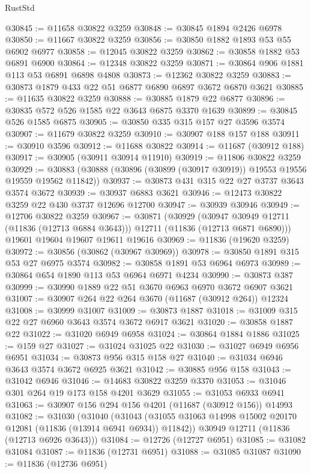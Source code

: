 \begin{lexlean}{RustStd}
\begin{coremodule}
@30845 := @11658 @30822 @3259
@30848 := @30845 @1894 @2426 @6978
@30850 := @11667 @30822 @3259
@30856 := @30850 @1882 @1893 @53 @55 @6902 @6977
@30858 := @12045 @30822 @3259
@30862 := @30858 @1882 @53 @6891 @6900
@30864 := @12348 @30822 @3259
@30871 := @30864 @906 @1881 @113 @53 @6891 @6898 @4808
@30873 := @12362 @30822 @3259
@30883 := @30873 @1879 @433 @22 @51 @6877 @6890 @6897 @3672 @6870 @3621
@30885 := @11635 @30822 @3259
@30888 := @30885 @1879 @22 @6877
@30896 := @30835 @572 @526 @1585 @22 @3643 @6875 @3370 @1639
@30899 := @30845 @526 @1585 @6875
@30905 := @30850 @335 @315 @157 @27 @3596 @3574
@30907 := @11679 @30822 @3259
@30910 := @30907 @188 @157 @188
@30911 := @30910 @3596
@30912 := @11688 @30822
@30914 := @11687 (@30912 @188)
@30917 := @30905 (@30911 @30914 @11910)
@30919 := @11806 @30822 @3259
@30929 := @30883 (@30888 (@30896 (@30899 (@30917 @30919)) @19553 @19556 @19559 @19562 @11842))
@30937 := @30873 @431 @315 @22 @27 @3737 @3643 @3574 @3672
@30939 := @30937 @6883 @3621
@30946 := @12473 @30822 @3259 @22 @430 @3737 @12696 @12700
@30947 := @30939 @30946
@30949 := @12706 @30822 @3259
@30967 := @30871
    (@30929
      (@30947 @30949 @12711 (@11836 (@12713 @6884 @3643)))
      @12711
      (@11836 (@12713 @6871 @6890)))
    @19601
    @19604
    @19607
    @19611
    @19616
@30969 := @11836 (@19620 @3259)
@30972 := @30856 (@30862 (@30967 @30969))
@30978 := @30850 @1891 @315 @53 @27 @6975 @3574
@30982 := @30858 @1891 @53 @6964 @6973
@30989 := @30864 @654 @1890 @113 @53 @6964 @6971 @4234
@30990 := @30873 @387
@30999 := @30990 @1889 @22 @51 @3670 @6963 @6970 @3672 @6907 @3621
@31007 := @30907 @264 @22 @264 @3670 (@11687 (@30912 @264)) @12324
@31008 := @30999 @31007
@31009 := @30873 @1887
@31018 := @31009 @315 @22 @27 @6960 @3643 @3574 @3672 @6917 @3621
@31020 := @30858 @1887 @22
@31022 := @31020 @6949 @6958
@31024 := @30864 @1884 @1886
@31025 := @159 @27
@31027 := @31024 @31025 @22
@31030 := @31027 @6949 @6956 @6951
@31034 := @30873 @956 @315 @158 @27
@31040 := @31034 @6946 @3643 @3574 @3672 @6925 @3621
@31042 := @30885 @956 @158
@31043 := @31042 @6946
@31046 := @14683 @30822 @3259 @3370
@31053 := @31046 @301 @264 @19 @173 @158 @4201 @3629
@31055 := @31053 @6933 @6941
@31063 := @30907 @156 @294 @156 @4201 (@11687 (@30912 @156)) @14993
@31082 := @31030
    (@31040
      (@31043 (@31055 @31063 @14998 @15002 @20170 @12081 (@11836 (@13914 @6941 @6934)) @11842))
      @30949
      @12711
      (@11836 (@12713 @6926 @3643)))
@31084 := @12726 (@12727 @6951)
@31085 := @31082 @31084
@31087 := @11836 (@12731 @6951)
@31088 := @31085 @31087
@31090 := @11836 (@12736 @6951)

\end{coremodule}
\end{lexlean}
